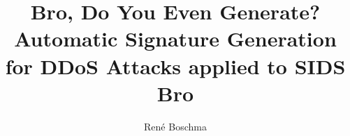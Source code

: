 \documentclass{libs/sig-alternate}
\begin{document}
\title{Bro, Do You Even Generate?\\
  \large Automatic Signature Generation for DDoS Attacks applied to SIDS Bro}

\author{
\alignauthor
	René Boschma\\
    \\
}


\maketitle


	








\newpage

\end{document}
